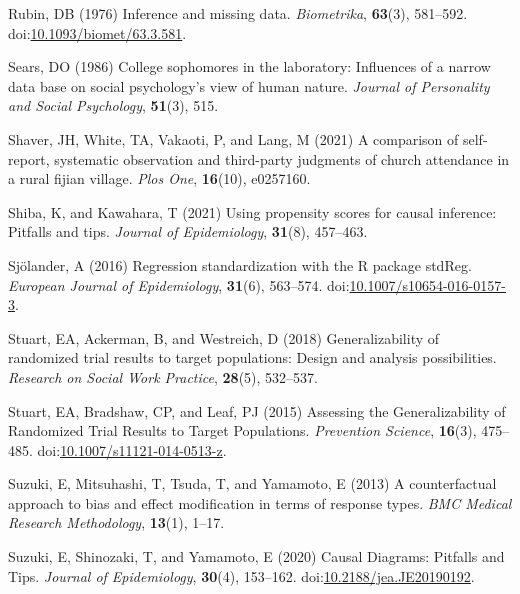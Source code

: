 \documentclass[
  single column]{article}
\newlength{\cslhangindent}
\newenvironment{CSLReferences}[2] %
 {\begin{list}{}{%
  \setlength{\itemindent}{0pt}
  \setlength{\leftmargin}{0pt}
  \setlength{\parsep}{0pt}
  \ifodd #1
   \setlength{\leftmargin}{\cslhangindent}
   \setlength{\itemindent}{-1\cslhangindent}
  \fi
  \setlength{\itemsep}{#2\baselineskip}}}
 {\end{list}}
\begin{document}
\begin{CSLReferences}{1}{0}
Rubin, DB (1976) Inference and missing data. \emph{Biometrika},
\textbf{63}(3), 581--592.
doi:\href{https://doi.org/10.1093/biomet/63.3.581}{10.1093/biomet/63.3.581}.

Sears, DO (1986) College sophomores in the laboratory: Influences of a
narrow data base on social psychology's view of human nature.
\emph{Journal of Personality and Social Psychology}, \textbf{51}(3),
515.

Shaver, JH, White, TA, Vakaoti, P, and Lang, M (2021) A comparison of
self-report, systematic observation and third-party judgments of church
attendance in a rural fijian village. \emph{Plos One}, \textbf{16}(10),
e0257160.

Shiba, K, and Kawahara, T (2021) Using propensity scores for causal
inference: Pitfalls and tips. \emph{Journal of Epidemiology},
\textbf{31}(8), 457--463.

Sjölander, A (2016) Regression standardization with the R package
stdReg. \emph{European Journal of Epidemiology}, \textbf{31}(6),
563--574.
doi:\href{https://doi.org/10.1007/s10654-016-0157-3}{10.1007/s10654-016-0157-3}.

Stuart, EA, Ackerman, B, and Westreich, D (2018) Generalizability of
randomized trial results to target populations: Design and analysis
possibilities. \emph{Research on Social Work Practice}, \textbf{28}(5),
532--537.

Stuart, EA, Bradshaw, CP, and Leaf, PJ (2015) Assessing the
Generalizability of Randomized Trial Results to Target Populations.
\emph{Prevention Science}, \textbf{16}(3), 475--485.
doi:\href{https://doi.org/10.1007/s11121-014-0513-z}{10.1007/s11121-014-0513-z}.

Suzuki, E, Mitsuhashi, T, Tsuda, T, and Yamamoto, E (2013) A
counterfactual approach to bias and effect modification in terms of
response types. \emph{BMC Medical Research Methodology}, \textbf{13}(1),
1--17.

Suzuki, E, Shinozaki, T, and Yamamoto, E (2020) Causal Diagrams:
Pitfalls and Tips. \emph{Journal of Epidemiology}, \textbf{30}(4),
153--162.
doi:\href{https://doi.org/10.2188/jea.JE20190192}{10.2188/jea.JE20190192}.


\end{CSLReferences}
\end{document}
